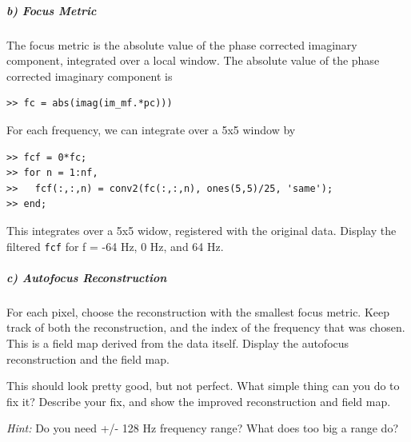 \documentclass[11pt]{article}
\begin{document}
\subparagraph*{b) Focus Metric}
The focus metric is the absolute value of the phase corrected imaginary component, integrated over a local window.  The absolute value of the phase corrected imaginary component is
\begin{verbatim}
>> fc = abs(imag(im_mf.*pc)))
\end{verbatim}
For each frequency, we can integrate over a 5x5 window by
\begin{verbatim}
>> fcf = 0*fc;
>> for n = 1:nf,
>>   fcf(:,:,n) = conv2(fc(:,:,n), ones(5,5)/25, 'same');
>> end;
\end{verbatim}
This integrates over a 5x5 widow, registered with the original data. Display the filtered \verb+fcf+ for f = -64 Hz, 0 Hz, and 64 Hz.

\subparagraph{c)  Autofocus Reconstruction}
For each pixel, choose the reconstruction with the smallest focus metric.  Keep track of both the reconstruction, and the index of the frequency that was chosen. This is a field map derived from the data itself.  Display the autofocus reconstruction and the field map. 

This should look pretty good, but not perfect.  What simple thing can you do to fix it? Describe your fix, and show the improved reconstruction and field map.

\vspace{0.125in}
{\em Hint:} Do you need +/- 128 Hz frequency range?  What does too big a range do?
\end{document}
